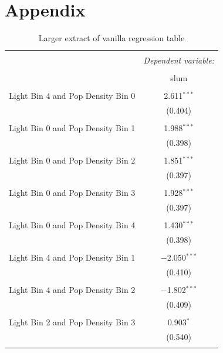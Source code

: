\section{Appendix}

\begin{table}[!htbp] \centering 
  \caption{Larger extract of vanilla regression table} 
  \label{appendix Larger extract of vanilla regression table} 
\begin{tabular}{@{\extracolsep{5pt}}lc} 
\\[-1.8ex]\hline 
\hline \\[-1.8ex] 
 & \multicolumn{1}{c}{\textit{Dependent variable:}} \\ 
\cline{2-2} 
\\[-1.8ex] & slum \\ 
\hline \\[-1.8ex] 
  Light Bin 4 and Pop Density Bin 0 & 2.611$^{***}$ \\ 
  & (0.404) \\ 
  & \\ 
 Light Bin 0 and Pop Density Bin 1 & 1.988$^{***}$ \\ 
  & (0.398) \\ 
  & \\ 
 Light Bin 0 and Pop Density Bin 2 & 1.851$^{***}$ \\ 
  & (0.397) \\ 
  & \\ 
 Light Bin 0 and Pop Density Bin 3 & 1.928$^{***}$ \\ 
  & (0.397) \\ 
  & \\ 
 Light Bin 0 and Pop Density Bin 4 & 1.430$^{***}$ \\ 
  & (0.398) \\ 
  & \\ 
 Light Bin 4 and Pop Density Bin 1 & $-$2.050$^{***}$ \\ 
  & (0.410) \\ 
  & \\
 Light Bin 4 and Pop Density Bin 2 & $-$1.802$^{***}$ \\ 
  & (0.409) \\ 
  & \\ 
 Light Bin 2 and Pop Density Bin 3 & 0.903$^{*}$ \\ 
  & (0.540) \\ 
  & \\

\end{tabular}
\end{table}
